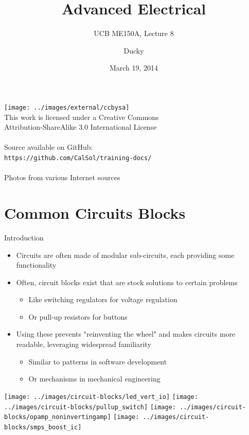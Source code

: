 \documentclass{beamer}
\title{Advanced Electrical}
\subtitle{UCB ME150A, Lecture 8}
\author[Ducky]{Ducky}
\date{March 19, 2014}
\begin{document}
\begin{frame}[plain] \centering
  \titlepage
  \begin{center} 
  \texttt{[image: ../images/external/ccbysa]} \\
  \tiny This work is licensed under a Creative Commons \\
  Attribution-ShareAlike 3.0 International License \\
  ~ \\
  Source available on GitHub: \\
  \texttt{https://github.com/CalSol/training-docs/} \\
  ~ \\
  Photos from various Internet sources
   \end{center}
\end{frame}

\section{Common Circuits Blocks}
\begin{frame}{Introduction}
  \begin{itemize}
    \item Circuits are often made of modular sub-circuits, each providing some functionality
    \item Often, circuit blocks exist that are stock solutions to certain problems
    \begin{itemize}
      \item Like switching regulators for voltage regulation
      \item Or pull-up resistors for buttons
    \end{itemize}
    \item Using these prevents "reinventing the wheel" and makes circuits more readable, leveraging widespread familiarity
    \begin{itemize}
      \item Similar to patterns in software development
      \item Or mechanisms in mechanical engineering
    \end{itemize}
  \end{itemize}
  \centering
  \texttt{[image: ../images/circuit-blocks/led\_vert\_io]}
  \texttt{[image: ../images/circuit-blocks/pullup\_switch]}
  \texttt{[image: ../images/circuit-blocks/opamp\_noninvertingamp]}
  \texttt{[image: ../images/circuit-blocks/smps\_boost\_ic]}
\end{frame}
\end{document}
